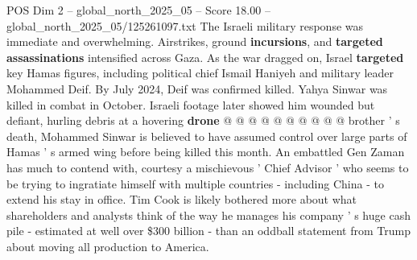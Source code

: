 \begin{textsample}{POS Dim 2 – global\_north\_2025\_05 – Score 18.00 – global\_north\_2025\_05/125261097.txt}
The Israeli military response was immediate and overwhelming.
Airstrikes, ground \textbf{incursions}, and \textbf{targeted} \textbf{assassinations} intensified across Gaza.
As the war dragged on, Israel \textbf{targeted} key Hamas figures, including political chief Ismail Haniyeh and military leader Mohammed Deif.
By July 2024, Deif was confirmed killed.
Yahya Sinwar was killed in combat in October.
Israeli footage later showed him wounded but defiant, hurling debris at a hovering \textbf{drone} @ @ @ @ @ @ @ @ @ @ brother ' s death, Mohammed Sinwar is believed to have assumed control over large parts of Hamas ' s armed wing before being killed this month.
An embattled Gen Zaman has much to contend with, courtesy a mischievous ' Chief Advisor ' who seems to be trying to ingratiate himself with multiple countries - including China - to extend his stay in office.
Tim Cook is likely bothered more about what shareholders and analysts think of the way he manages his company ' s huge cash pile - estimated at well over \$300 billion - than an oddball statement from Trump about moving all production to America.

\end{textsample}
